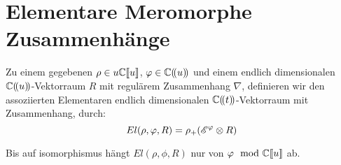 \chapter{Elementare Meromorphe Zusammenhänge}

\begin{defn}
\cite[Def 2.1]{sabbah_Fourier-local}
\begin{comment}
Alternative. ausfürlichere / komplexe definition \cite[Def 5.4.5.]{sabbah_cimpa90}
\end{comment}
Zu einem gegebenen $\rho\in u\mathbb{C}\llbracket u\rrbracket$,
$\varphi\in\mathbb{C}(\!(u)\!)$ und einem endlich dimensionalen
$\mathbb{C}(\!(u)\!)$-Vektorraum $R$ mit regulärem Zusammenhang $\nabla$,
definieren wir den assoziierten Elementaren endlich dimensionalen
$\mathbb{C}(\!(t)\!)$-Vektorraum mit Zusammenhang, durch:
\[
El(\rho,\varphi,R)=\rho_+(\mathscr{E}^\varphi\otimes R)
\]
\end{defn}
\cite[nach Def 2.1]{sabbah_Fourier-local}
Bis auf isomorphismus hängt $El(\rho,\phi,R)$ nur von $\varphi\mod{{\mathbb C\llbracket u\rrbracket}}$ ab.
\begin{lem}
\cite[Lem 2.2]{sabbah_Fourier-local}
\end{lem}

